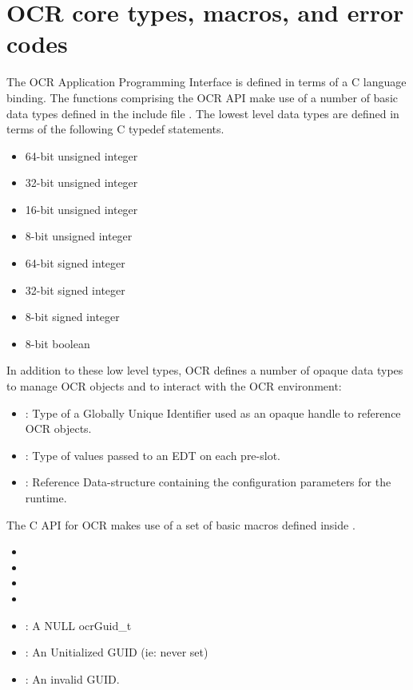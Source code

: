 %

\section{OCR core types, macros, and error codes}
\label{sec:OCRtypesmacros}

The OCR Application Programming Interface is defined in terms of a C language binding.  
The functions comprising the OCR
API make use of a number of basic data types defined in the include file .
The lowest level data types are defined in terms of the following C typedef statements.
\begin{itemize}
\item {} 64-bit unsigned integer
\item {} 32-bit unsigned integer
\item {} 16-bit unsigned integer
\item {} 8-bit unsigned integer
\item {} 64-bit signed integer
\item {} 32-bit signed integer
\item {} 8-bit signed integer
\item {} 8-bit boolean
\end{itemize}

In addition to these low level types, OCR defines a number of opaque data types 
to manage OCR objects and to interact with the OCR environment:
\begin{itemize}
\item {}: Type of a Globally Unique Identifier used as an opaque handle 
to reference OCR objects.
\item {}:  Type of values passed to an EDT on each pre-slot.
%
\item {}:  Reference
Data-structure containing the configuration parameters for the runtime.
\end{itemize}

The C API for OCR makes use of a set of basic macros defined 
 inside .
\begin{itemize}
\item {}
\item {}
\item {}
\item {}
\item {}: A NULL ocrGuid\_t
\item {}: An Unitialized GUID (ie: never set)
\item {}: An invalid GUID.
\end{itemize}

